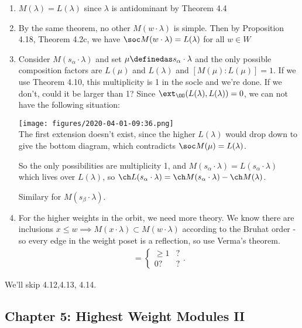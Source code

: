\begin{enumerate}
\def\labelenumi{\arabic{enumi}.}
\item
  \(M(\lambda) = L(\lambda)\) since \(\lambda\) is antidominant by
  Theorem 4.4
\item
  By the same theorem, no other \(M(w\cdot \lambda)\) is simple. Then by
  Proposition 4.18, Theorem 4.2c, we have
  \(\soc M(w\cdot \lambda) = L(\lambda)\) for all \(w\in W\)
\item
  Consider \(M(s_\alpha \cdot \lambda)\) and set
  \(\mu \definedas s_\alpha \cdot \lambda\) and the only possible
  composition factors are \(L(\mu)\) and \(L(\lambda)\) and
  \([M(\mu): L(\mu) ] = 1\). If we use Theorem 4.10, this multiplicity
  is 1 in the socle and we're done. If we don't, could it be larger than
  1? Since \(\ext_\OO (L(\lambda), L(\lambda)) = 0\), we can not have
  the following situation:

  \texttt{[image: figures/2020-04-01-09:36.png]}\\

  The first extension doesn't exist, since the higher \(L(\lambda)\)
  would drop down to give the bottom diagram, which contradicts
  \(\soc M(\mu) = L(\lambda)\).

  So the only possibilities are multiplicity 1, and
  \(M(s_\alpha \cdot \lambda) = L(s_\alpha \cdot \lambda)\) which lives
  over \(L(\lambda)\), so
  \(\ch L(s_\alpha \cdot \lambda) = \ch M(s_\alpha \cdot \lambda) - \ch M(\lambda)\).

  Similary for \(M(s_\beta \cdot \lambda)\).
\item
  For the higher weights in the orbit, we need more theory. We know
  there are inclusions
  \(x\leq w \implies M(x\cdot \lambda) \subset M(w\cdot \lambda)\)
  according to the Bruhat order - so every edge in the weight poset is a
  reflection, so use Verma's theorem. \begin{align*}
   [M(w\cdot \lambda): L(x \cdot \lambda)] = \begin{cases}
   \geq 1 & ? \\
   0? & ?
   \end{cases}
   .\end{align*}
\end{enumerate}

We'll skip 4.12,4.13, 4.14.

\hypertarget{chapter-5-highest-weight-modules-ii}{%
\subsection{Chapter 5: Highest Weight Modules
II}\label{chapter-5-highest-weight-modules-ii}}


